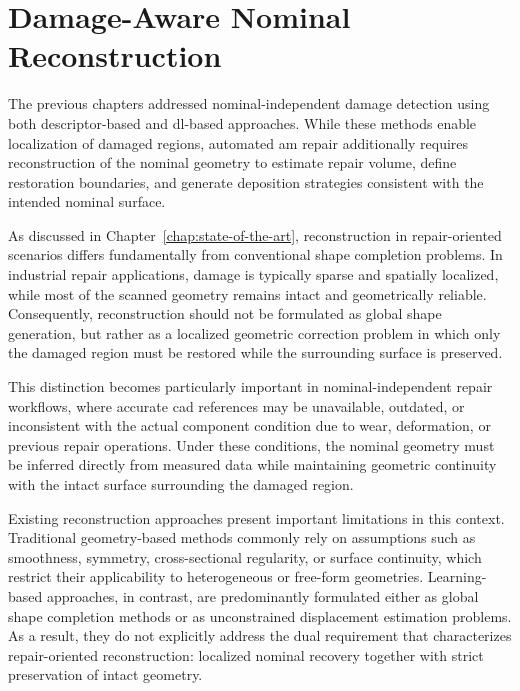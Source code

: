 \acresetall
\chapter{Damage-Aware Nominal Reconstruction}
\label{chap:ml-reconstruction}


The previous chapters addressed nominal-independent damage detection using both descriptor-based and \ac{dl}-based approaches. While these methods enable localization of damaged regions, automated \ac{am} repair additionally requires reconstruction of the nominal geometry to estimate repair volume, define restoration boundaries, and generate deposition strategies consistent with the intended nominal surface.

As discussed in Chapter~\ref{chap:state-of-the-art}, reconstruction in repair-oriented scenarios differs fundamentally from conventional shape completion problems. In industrial repair applications, damage is typically sparse and spatially localized, while most of the scanned geometry remains intact and geometrically reliable. Consequently, reconstruction should not be formulated as global shape generation, but rather as a localized geometric correction problem in which only the damaged region must be restored while the surrounding surface is preserved.

This distinction becomes particularly important in nominal-independent repair workflows, where accurate \ac{cad} references may be unavailable, outdated, or inconsistent with the actual component condition due to wear, deformation, or previous repair operations. Under these conditions, the nominal geometry must be inferred directly from measured data while maintaining geometric continuity with the intact surface surrounding the damaged region.

Existing reconstruction approaches present important limitations in this context. Traditional geometry-based methods commonly rely on assumptions such as smoothness, symmetry, cross-sectional regularity, or surface continuity, which restrict their applicability to heterogeneous or free-form geometries. Learning-based approaches, in contrast, are predominantly formulated either as global shape completion methods or as unconstrained displacement estimation problems. As a result, they do not explicitly address the dual requirement that characterizes repair-oriented reconstruction: localized nominal recovery together with strict preservation of intact geometry.

